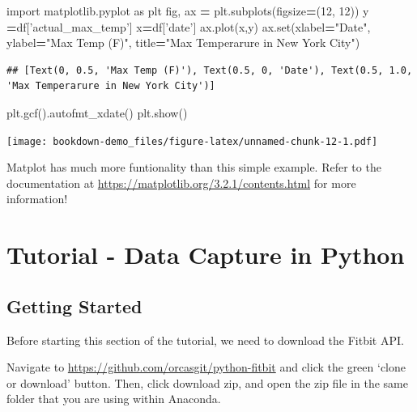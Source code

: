 \documentclass[]{book}
\newenvironment{Shaded}{\begin{snugshade}}{\end{snugshade}}
\newcommand{\DecValTok}[1]{\textcolor[rgb]{0.00,0.00,0.81}{#1}}
\newcommand{\StringTok}[1]{\textcolor[rgb]{0.31,0.60,0.02}{#1}}
\newcommand{\ImportTok}[1]{#1}
\newcommand{\OperatorTok}[1]{\textcolor[rgb]{0.81,0.36,0.00}{\textbf{#1}}}
\newcommand{\BuiltInTok}[1]{#1}
\newcommand{\NormalTok}[1]{#1}
\begin{document}
\begin{Shaded}
\begin{Highlighting}[]
\ImportTok{import}\NormalTok{ matplotlib.pyplot }\ImportTok{as}\NormalTok{ plt}
\NormalTok{fig, ax }\OperatorTok{=}\NormalTok{ plt.subplots(figsize}\OperatorTok{=}\NormalTok{(}\DecValTok{12}\NormalTok{, }\DecValTok{12}\NormalTok{))}
\NormalTok{y }\OperatorTok{=}\NormalTok{df[}\StringTok{'actual_max_temp'}\NormalTok{]}
\NormalTok{x}\OperatorTok{=}\NormalTok{df[}\StringTok{'date'}\NormalTok{]}
\NormalTok{ax.plot(x,y)}
\NormalTok{ax.}\BuiltInTok{set}\NormalTok{(xlabel}\OperatorTok{=}\StringTok{"Date"}\NormalTok{, ylabel}\OperatorTok{=}\StringTok{"Max Temp (F)"}\NormalTok{, title}\OperatorTok{=}\StringTok{"Max Temperarure in New York City"}\NormalTok{)}
\end{Highlighting}
\end{Shaded}

\begin{verbatim}
## [Text(0, 0.5, 'Max Temp (F)'), Text(0.5, 0, 'Date'), Text(0.5, 1.0, 'Max Temperarure in New York City')]
\end{verbatim}

\begin{Shaded}
\begin{Highlighting}[]
\NormalTok{plt.gcf().autofmt_xdate()}
\NormalTok{plt.show()}
\end{Highlighting}
\end{Shaded}

\texttt{[image: bookdown-demo\_files/figure-latex/unnamed-chunk-12-1.pdf]}

Matplot has much more funtionality than this simple example. Refer to
the documentation at \url{https://matplotlib.org/3.2.1/contents.html}
for more information!

\chapter{Tutorial - Data Capture in
Python}\label{tutorial---data-capture-in-python}

\section{Getting Started}\label{getting-started}

Before starting this section of the tutorial, we need to download the
Fitbit API.

Navigate to \url{https://github.com/orcasgit/python-fitbit} and click
the green `clone or download' button. Then, click download zip, and open
the zip file in the same folder that you are using within Anaconda.
\end{document}
